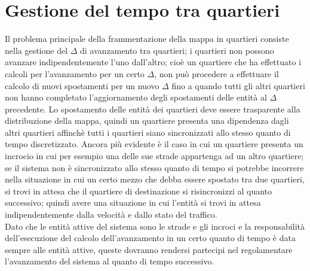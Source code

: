 \section{Gestione del tempo tra quartieri}
Il problema principale della frammentazione della mappa in quartieri consiste nella gestione del $\Delta$ di avanzamento tra quartieri; i quartieri non possono avanzare indipendentemente l'uno dall'altro; cioè un quartiere che ha effettuato i calcoli per l'avanzamento per un certo $\Delta$, non può procedere a effettuare il calcolo di nuovi spostamenti per un nuovo $\Delta$ fino a quando tutti gli altri quartieri non hanno completato l'aggiornamento degli spostamenti delle entità al $\Delta$ precedente. Lo spostamento delle entità dei quartieri deve essere trasparente alla distribuzione della mappa, quindi un quartiere presenta una dipendenza dagli altri quartieri affinchè tutti i quartieri siano sincronizzati allo stesso quanto di tempo discretizzato. Ancora più evidente è il caso in cui un quartiere presenta un incrocio in cui per esempio una delle sue strade appartenga ad un altro quartiere; se il sistema non è sincronizzato allo stesso quanto di tempo si potrebbe incorrere nella situazione in cui un certo mezzo che debba essere spostato tra due quartieri, si trovi in attesa che il quartiere di destinazione si risincronizzi al quanto successivo; quindi avere una situazione in cui l'entità si trovi in attesa indipendentemente dalla velocità e dallo stato del traffico.\\
Dato che le entità attive del sistema sono le strade e gli incroci e la
responsabilità dell'esecuzione del calcolo dell'avanzamento in un certo quanto
di tempo è data sempre alle entità attive, queste dovranno rendersi partecipi
nel regolamentare l'avanzamento del sistema al quanto di tempo successivo.\\

